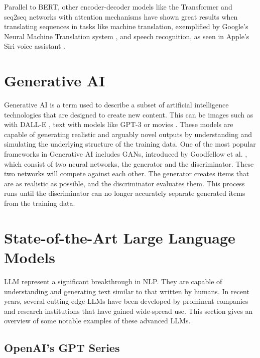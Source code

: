 Parallel to \gls{BERT}, other encoder-decoder models like the Transformer \cite{vaswani_attention_2017} and \gls{seq2seq} networks with attention mechanisms \cite{bahdanau_neural_2014} have shown great results when translating sequences in tasks like machine translation, exemplified by Google's Neural Machine Translation system \cite{wu_googles_2016}, and speech recognition, as seen in Apple's Siri voice assistant \cite{hinton_deep_2012}.


\section{Generative AI}


Generative AI is a term used to describe a subset of artificial intelligence technologies that are designed to create new content. This can be images such as with DALL-E \cite{ramesh_zero-shot_2021-1}, text with models like GPT-3 \cite{brown_language_2020-2} or movies \cite{openai_video_2024}. These models are capable of generating realistic and arguably novel outputs by understanding and simulating the underlying structure of the training data. One of the most popular frameworks in Generative AI includes \gls{GAN}s, introduced by Goodfellow et al. \cite{goodfellow_generative_2014}, which consist of two neural networks, the generator and the discriminator. These two networks will compete against each other. The generator creates items that are as realistic as possible, and the discriminator evaluates them. This process runs until the discriminator can no longer accurately separate generated items from the training data.


\section{State-of-the-Art Large Language Models}


\gls{LLM} represent a significant breakthrough in \gls{NLP}. They are capable of understanding and generating text similar to that written by humans. In recent years, several cutting-edge \gls{LLM}s have been developed by prominent companies and research institutions that have gained wide-spread use. This section gives an overview of some notable examples of these advanced \gls{LLM}s.


\label{sec:openai_models}
\subsection{OpenAI's GPT Series}


